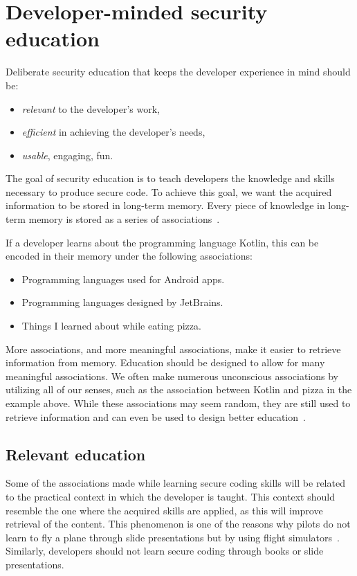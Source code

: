 \section{Developer-minded security education}

Deliberate security education that keeps the developer experience in mind should be:
\begin{itemize}[noitemsep]
    \item \emph{relevant} to the developer's work,
    \item \emph{efficient} in achieving the developer's needs,
    \item \emph{usable}, engaging, fun.
\end{itemize}

The goal of security education is to teach developers the knowledge and skills necessary to produce secure code. To achieve this goal, we want the acquired information to be stored in long-term memory. Every piece of knowledge in long-term memory is stored as a series of associations~\citep{dirksen2015design}. 

If a developer learns about the programming language Kotlin, this can be encoded in their memory under the following associations:
\begin{itemize}[noitemsep]
    \item Programming languages used for Android apps.
    \item Programming languages designed by JetBrains.
    \item Things I learned about while eating pizza.
\end{itemize}

More associations, and more meaningful associations, make it easier to retrieve information from memory. Education should be designed to allow for many meaningful associations.
We often make numerous unconscious associations by utilizing all of our senses, such as the association between Kotlin and pizza in the example above. While these associations may seem random, they are still used to retrieve information and can even be used to design better education~\citep{dirksen2015design}. 

\subsection{Relevant education}
Some of the associations made while learning secure coding skills will be related to the practical context in which the developer is taught. This context should resemble the one where the acquired skills are applied, as this will improve retrieval of the content. This phenomenon is one of the reasons why pilots do not learn to fly a plane through slide presentations but by using flight simulators~\citep{dirksen2015design}. Similarly, developers should not learn secure coding through books or slide presentations. 

